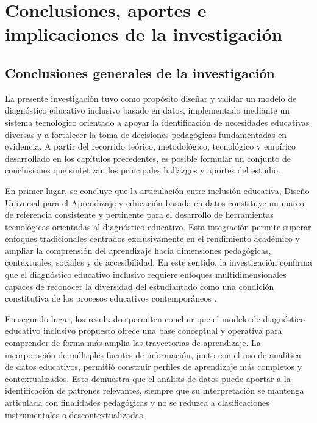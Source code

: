\chapter{Conclusiones, aportes e implicaciones de la investigación}

\begin{refsection}

\section{Conclusiones generales de la investigación}

La presente investigación tuvo como propósito diseñar y validar un modelo de diagnóstico educativo inclusivo basado en datos, implementado mediante un sistema tecnológico orientado a apoyar la identificación de necesidades educativas diversas y a fortalecer la toma de decisiones pedagógicas fundamentadas en evidencia. A partir del recorrido teórico, metodológico, tecnológico y empírico desarrollado en los capítulos precedentes, es posible formular un conjunto de conclusiones que sintetizan los principales hallazgos y aportes del estudio.

En primer lugar, se concluye que la articulación entre inclusión educativa, Diseño Universal para el Aprendizaje y educación basada en datos constituye un marco de referencia consistente y pertinente para el desarrollo de herramientas tecnológicas orientadas al diagnóstico educativo. Esta integración permite superar enfoques tradicionales centrados exclusivamente en el rendimiento académico y ampliar la comprensión del aprendizaje hacia dimensiones pedagógicas, contextuales, sociales y de accesibilidad. En este sentido, la investigación confirma que el diagnóstico educativo inclusivo requiere enfoques multidimensionales capaces de reconocer la diversidad del estudiantado como una condición constitutiva de los procesos educativos contemporáneos \parencite{unesco2020,oecd2019}.

En segundo lugar, los resultados permiten concluir que el modelo de diagnóstico educativo inclusivo propuesto ofrece una base conceptual y operativa para comprender de forma más amplia las trayectorias de aprendizaje. La incorporación de múltiples fuentes de información, junto con el uso de analítica de datos educativos, permitió construir perfiles de aprendizaje más completos y contextualizados. Esto demuestra que el análisis de datos puede aportar a la identificación de patrones relevantes, siempre que su interpretación se mantenga articulada con finalidades pedagógicas y no se reduzca a clasificaciones instrumentales o descontextualizadas.


\end{refsection}

